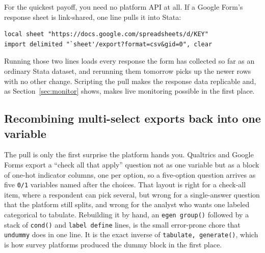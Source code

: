 \documentclass[
    a4paper,
    fontsize=10pt,
    twoside=true,
    numbers=noenddot,
]{kaobook}
\begin{document}
For the quickest payoff, you need no platform API at all. If a Google Form's response sheet is link-shared, one line pulls it into Stata:
\par
{\footnotesize
\begin{verbatim}
local sheet "https://docs.google.com/spreadsheets/d/KEY"
import delimited "`sheet'/export?format=csv&gid=0", clear
\end{verbatim}
}
Running those two lines loads every response the form has collected so far as an ordinary Stata dataset, and rerunning them tomorrow picks up the newer rows with no other change. Scripting the pull makes the response data replicable and, as Section~\ref{sec:monitor} shows, makes live monitoring possible in the first place.

\subsection{Recombining multi-select exports back into one variable}
The pull is only the first surprise the platform hands you. Qualtrics and Google Forms export a ``check all that apply'' question not as one variable but as a block of one-hot indicator columns, one per option, so a five-option question arrives as five \texttt{0/1} variables named after the choices. That layout is right for a check-all item, where a respondent can pick several, but wrong for a single-answer question that the platform still splits, and wrong for the analyst who wants one labeled categorical to tabulate. Rebuilding it by hand, an \texttt{egen group()} followed by a stack of \texttt{cond()} and \texttt{label define} lines, is the small error-prone chore that \texttt{undummy} does in one line. It is the exact inverse of \texttt{tabulate, generate()}, which is how survey platforms produced the dummy block in the first place.
\end{document}

